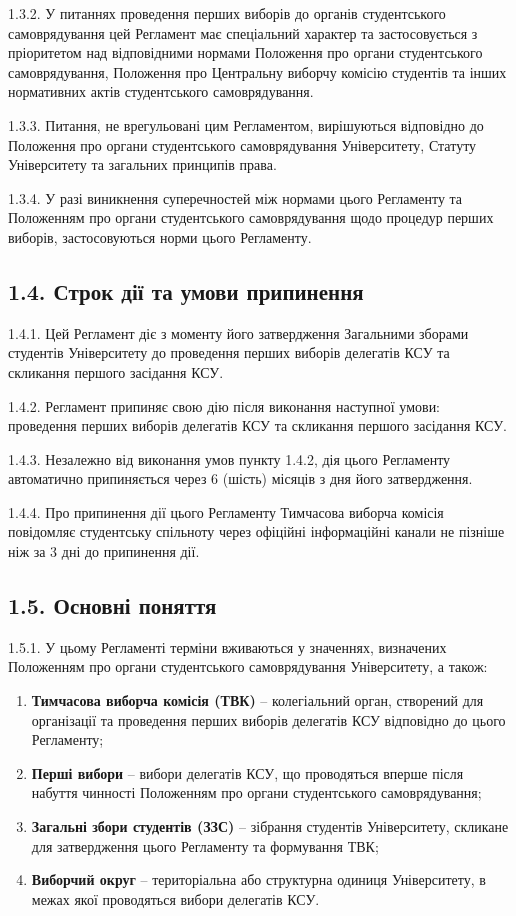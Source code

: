     1.3.2. У питаннях проведення перших виборів до органів студентського самоврядування цей Регламент має спеціальний характер та застосовується з пріоритетом над відповідними нормами Положення про органи студентського самоврядування, Положення про Центральну виборчу комісію студентів та інших нормативних актів студентського самоврядування.

    1.3.3. Питання, не врегульовані цим Регламентом, вирішуються відповідно до Положення про органи студентського самоврядування Університету, Статуту Університету та загальних принципів права.

    1.3.4. У разі виникнення суперечностей між нормами цього Регламенту та Положенням про органи студентського самоврядування щодо процедур перших виборів, застосовуються норми цього Регламенту.

\subsection*{1.4. Строк дії та умови припинення}
    1.4.1. Цей Регламент діє з моменту його затвердження Загальними зборами студентів Університету до проведення перших виборів делегатів КСУ та скликання першого засідання КСУ.

    1.4.2. Регламент припиняє свою дію після виконання наступної умови: проведення перших виборів делегатів КСУ та скликання першого засідання КСУ.

    1.4.3. Незалежно від виконання умов пункту 1.4.2, дія цього Регламенту автоматично припиняється через 6 (шість) місяців з дня його затвердження.

    1.4.4. Про припинення дії цього Регламенту Тимчасова виборча комісія повідомляє студентську спільноту через офіційні інформаційні канали не пізніше ніж за 3 дні до припинення дії.

\subsection*{1.5. Основні поняття}
    1.5.1. У цьому Регламенті терміни вживаються у значеннях, визначених Положенням про органи студентського самоврядування Університету, а також:

        \begin{enumerate}[label=\alph*)]
            \item \textbf{Тимчасова виборча комісія (ТВК)} -- колегіальний орган, створений для організації та проведення перших виборів делегатів КСУ відповідно до цього Регламенту;
            \item \textbf{Перші вибори} -- вибори делегатів КСУ, що проводяться вперше після набуття чинності Положенням про органи студентського самоврядування;
            \item \textbf{Загальні збори студентів (ЗЗС)} -- зібрання студентів Університету, скликане для затвердження цього Регламенту та формування ТВК;
            \item \textbf{Виборчий округ} -- територіальна або структурна одиниця Університету, в межах якої проводяться вибори делегатів КСУ.
        \end{enumerate}